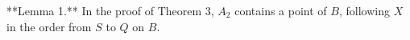**Lemma 1.** In the proof of Theorem 3, $A_2$ contains a point of $B$, following $X$ in the order from $S$ to $Q$ on $B$.
